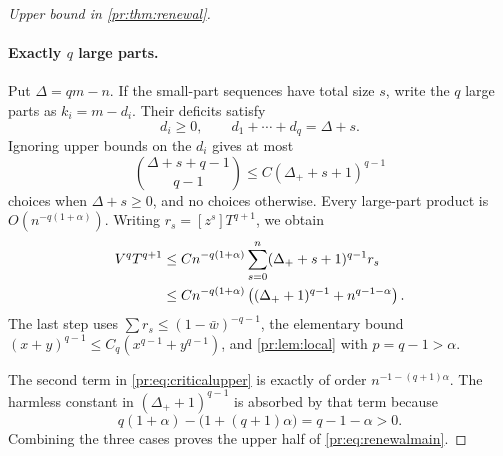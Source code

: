 \documentclass[11pt,a4paper]{article}
\theoremstyle{definition}\newaliascnt{definition}{theorem}
\theoremstyle{remark}\newaliascnt{remark}{theorem}
\newcommand{\prcoef}[2]{[#1^{#2}]}
\begin{document}
\begin{proof}[Upper bound in \cref{pr:thm:renewal}]
\paragraph{Exactly $q$ large parts.}
Put $\Delta=qm-n$. If the small-part sequences have total size $s$, write the
$q$ large parts as $k_i=m-d_i$. Their deficits satisfy
\[
 d_i\ge0,\qquad d_1+\cdots+d_q=\Delta+s.
\]
Ignoring upper bounds on the $d_i$ gives at most
\[
 \binom{\Delta+s+q-1}{q-1}
 \le C(\Delta_++s+1)^{q-1}
\]
choices when $\Delta+s\ge0$, and no choices otherwise. Every large-part
product is $O(n^{-q(1+\alpha)})$. Writing $r_s=\prcoef zs T^{q+1}$, we obtain
\begin{align}
 \prcoef zn V^qT^{q+1}
 &\le Cn^{-q(1+\alpha)}
       \sum_{s=0}^n(\Delta_++s+1)^{q-1}r_s\notag\\
 &\le Cn^{-q(1+\alpha)}
       \left((\Delta_++1)^{q-1}+n^{q-1-\alpha}\right).
 \label{pr:eq:criticalupper}
\end{align}
The last step uses $\sum r_s\le(1-\bar w)^{-q-1}$, the elementary bound
$(x+y)^{q-1}\le C_q(x^{q-1}+y^{q-1})$, and \cref{pr:lem:local} with
$p=q-1>\alpha$.

The second term in \eqref{pr:eq:criticalupper} is exactly of order
$n^{-1-(q+1)\alpha}$. The harmless constant in $(\Delta_++1)^{q-1}$ is
absorbed by that term because
\[
 q(1+\alpha)-\bigl(1+(q+1)\alpha\bigr)=q-1-\alpha>0.
\]
Combining the three cases proves the upper half of \eqref{pr:eq:renewalmain}.
\end{proof}
\end{document}
